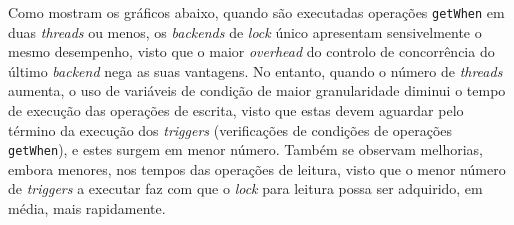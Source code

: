 \documentclass[11pt, a4paper]{article}
\begin{document}
Como mostram os gráficos abaixo, quando são executadas operações \texttt{getWhen} em duas
\emph{threads} ou menos, os \emph{backends} de \emph{lock} único apresentam sensivelmente o mesmo
desempenho, visto que o maior \emph{overhead} do controlo de concorrência do último \emph{backend}
nega as suas vantagens. No entanto, quando o número de \emph{threads} aumenta, o uso de variáveis de
condição de maior granularidade diminui o tempo de execução das operações de escrita, visto que
estas devem aguardar pelo término da execução dos \emph{triggers} (verificações de condições de
operações \texttt{getWhen}), e estes surgem em menor número. Também se observam melhorias, embora
menores, nos tempos das operações de leitura, visto que o menor número de \emph{triggers} a executar
faz com que o \emph{lock} para leitura possa ser adquirido, em média, mais rapidamente.
\end{document}
